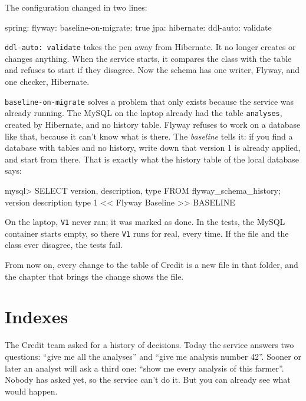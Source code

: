 The configuration changed in two lines:

\begin{code}[language={}]
spring:
  flyway:
    baseline-on-migrate: true
  jpa:
    hibernate:
      ddl-auto: validate
\end{code}

\texttt{ddl-auto: validate} takes the pen away from Hibernate. It no longer
creates or changes anything. When the service starts, it compares the class
with the table and refuses to start if they disagree. Now the schema has one
writer, Flyway, and one checker, Hibernate.

\texttt{baseline-on-migrate} solves a problem that only exists because the
service was already running. The MySQL on the laptop already had the table
\texttt{analyses}, created by Hibernate, and no history table. Flyway refuses
to work on a database like that, because it can't know what is there. The
\emph{baseline} tells it: if you find a database with tables and no history,
write down that version 1 is already applied, and start from there. That is
exactly what the history table of the local database says:

\begin{terminal}
mysql> SELECT version, description, type FROM flyway_schema_history;
version  description            type
1        << Flyway Baseline >>  BASELINE
\end{terminal}

On the laptop, \texttt{V1} never ran; it was marked as done. In the tests,
the MySQL container starts empty, so there \texttt{V1} runs for real, every
time. If the file and the class ever disagree, the tests fail.

From now on, every change to the table of Credit is a new file in that
folder, and the chapter that brings the change shows the file.

\section{Indexes}
\label{sec:two-indexes}


The Credit team asked for a history of decisions. Today the service answers
two questions: ``give me all the analyses'' and ``give me analysis number
42''. Sooner or later an analyst will ask a third one: ``show me every
analysis of this farmer''. Nobody has asked yet, so the service can't do it.
But you can already see what would happen.

